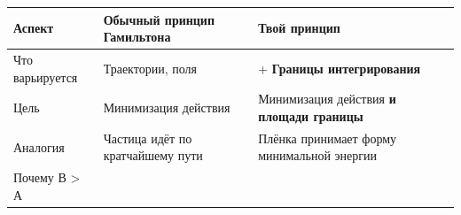 \documentclass[11pt]{article}
\begin{document}
\begin{longtable}[]{@{}lll@{}}
\toprule
\begin{minipage}[b]{0.10\columnwidth}\raggedright\strut
Аспект\strut
\end{minipage} & \begin{minipage}[b]{0.37\columnwidth}\raggedright\strut
Обычный принцип Гамильтона\strut
\end{minipage} & \begin{minipage}[b]{0.18\columnwidth}\raggedright\strut
Твой принцип\strut
\end{minipage}\tabularnewline
\midrule
\endhead
\begin{minipage}[t]{0.10\columnwidth}\raggedright\strut
Что варьируется\strut
\end{minipage} & \begin{minipage}[t]{0.37\columnwidth}\raggedright\strut
Траектории, поля\strut
\end{minipage} & \begin{minipage}[t]{0.18\columnwidth}\raggedright\strut
+ \textbf{Границы интегрирования}\strut
\end{minipage}\tabularnewline
\begin{minipage}[t]{0.10\columnwidth}\raggedright\strut
Цель\strut
\end{minipage} & \begin{minipage}[t]{0.37\columnwidth}\raggedright\strut
Минимизация действия\strut
\end{minipage} & \begin{minipage}[t]{0.18\columnwidth}\raggedright\strut
Минимизация действия \textbf{и площади границы}\strut
\end{minipage}\tabularnewline
\begin{minipage}[t]{0.10\columnwidth}\raggedright\strut
Аналогия\strut
\end{minipage} & \begin{minipage}[t]{0.37\columnwidth}\raggedright\strut
Частица идёт по кратчайшему пути\strut
\end{minipage} & \begin{minipage}[t]{0.18\columnwidth}\raggedright\strut
Плёнка принимает форму минимальной энергии\strut
\end{minipage}\tabularnewline
\begin{minipage}[t]{0.10\columnwidth}\raggedright\strut
Почему В \textgreater{} А\strut
\end{minipage} & \begin{minipage}[t]{0.37\columnwidth}\raggedright\strut

\end{minipage}
\end{longtable}
\end{document}
